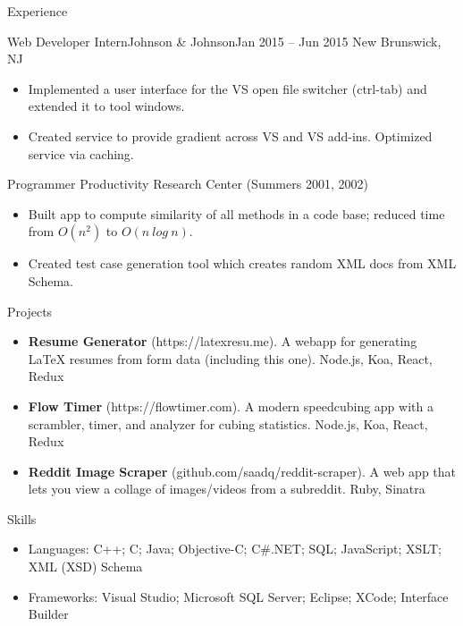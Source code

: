\documentclass[a4paper]{mcdowellcv}
\begin{document}
\begin{cvsection}{Experience}
		\begin{cvsubsection}{Web Developer Intern}{Johnson \& Johnson}{Jan 2015 -- Jun 2015}
			New Brunswick, NJ		
			\begin{itemize}
				\item Implemented a user interface for the VS open file switcher (ctrl-tab) and extended it to tool windows.
				\item Created service to provide gradient across VS and VS add-ins. Optimized service via caching.
			\end{itemize}
			Programmer Productivity Research Center (Summers 2001, 2002)
			\begin{itemize}
				\item Built app to compute similarity of all methods in a code base; reduced time from $O(n^2)$ to $O(n\ log\ n)$. 
				\item Created test case generation tool which creates random XML docs from XML Schema.
			\end{itemize}
		\end{cvsubsection}
	\end{cvsection}
	
	\begin{cvsection}{Projects}
		\begin{cvsubsection}{}{}{}
    	    \begin{itemize}
        		\item \textbf{Resume Generator} (https://latexresu.me). A webapp for generating LaTeX resumes from form data (including this one).  Node.js, Koa, React, Redux
        		\item \textbf{Flow Timer} (https://flowtimer.com). A modern speedcubing app with a scrambler, timer, and analyzer for cubing statistics.  Node.js, Koa, React, Redux
        		\item \textbf{Reddit Image Scraper} (github.com/saadq/reddit-scraper).  A web app that lets you view a collage of images/videos from a subreddit. Ruby, Sinatra
    	\end{itemize}
	    \end{cvsubsection}
	\end{cvsection}
	
	\begin{cvsection}{Skills}
		\begin{cvsubsection}{}{}{}	
			\begin{itemize}
				\item Languages: C++; C; Java; Objective-C; C\#.NET; SQL; JavaScript; XSLT; XML (XSD) Schema 
				\item Frameworks: Visual Studio; Microsoft SQL Server; Eclipse; XCode; Interface Builder
			\end{itemize}
		\end{cvsubsection}
	\end{cvsection}
	
\end{document}
